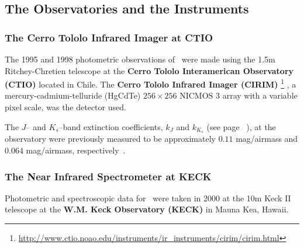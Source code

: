 
\subsection{The Observatories and the Instruments}\label{cha:GROJ1655-40:sec:ObservationsOfJ1655:subsec:ObservatoriesAndInstruments}


\subsubsection{The Cerro Tololo Infrared Imager at CTIO}\label{cha:GROJ1655-40:sec:ObservationsOfJ1655:subsubsec:CIRIM}

The 1995 and 1998 photometric observations of \groj\ were made using the
1.5m Ritchey-Chretien telescope at the \textbf{Cerro Tololo
Interamerican Observatory (CTIO)} located in Chile. The \textbf{Cerro
Tololo Infrared Imager (CIRIM)}%
\footnote{\label{cha:GROJ1655-40:sec:ObservationsOfJ1655:subsubsec:CIRIM:foot:CIRIM}
\url{http://www.ctio.noao.edu/instruments/ir_instruments/cirim/cirim.html}
}%
, a mercury-cadmium-telluride (HgCdTe) $256\times256$ NICMOS 3
array with a variable pixel scale, was the detector used. %

\vspace{\myparskip}

The $J$-- and $K_s$--band extinction coefficients, $k_J$ and $k_{K_{s}}$ (see
page~%
\pageref{cha:InfraredDataReductionTechniques:sec:MagnitudeScale:subsec:AtmosphericExtinction:topic:k}%
), at the observatory were previously measured
to be approximately $0.11$ mag/airmass and $0.064$ mag/airmass,
respectively~\cite{Curran:2001}.


\subsubsection{The Near Infrared Spectrometer at KECK}\label{cha:GROJ1655-40:sec:ObservationsOfJ1655:subsubsec:NIRSPEC}

Photometric and spectroscopic data for \groj\ were taken in 2000 at
the 10m Keck II telescope at the \textbf{W.M. Keck Observatory (KECK)}
in Mauna Kea, Hawaii.

\vspace{\myparskip}

